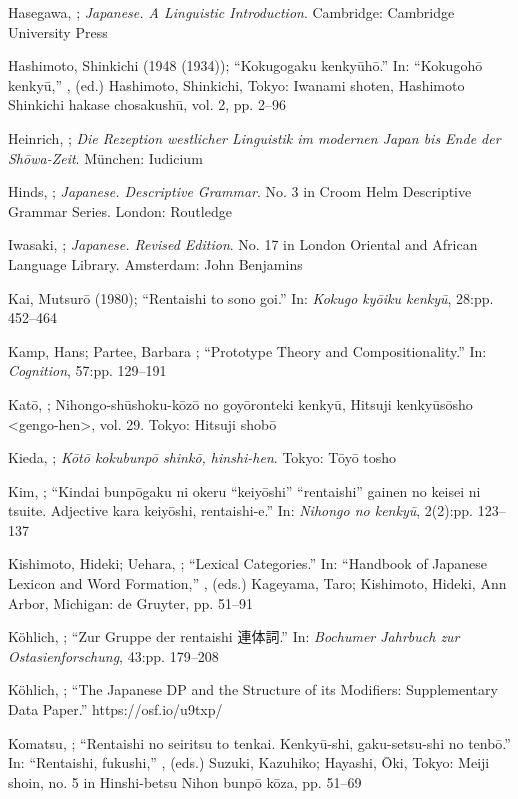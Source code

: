 \documentclass[output=paper]{langscibook}
\begin{document}
Hasegawa, \citet{Yoko2015}; \textit{Japanese. A Linguistic Introduction}. Cambridge: Cambridge University Press 

Hashimoto, Shinkichi (1948 (1934)); “Kokugogaku kenkyūhō.” In: “Kokugohō kenkyū,” , (ed.) Hashimoto, Shinkichi, Tokyo: Iwanami shoten, Hashimoto Shinkichi hakase chosakushū, vol. 2, pp. 2–96 

Heinrich, \citet{Patrick2002}; \textit{Die Rezeption westlicher Linguistik im modernen Japan bis Ende der Shōwa-Zeit}. München: Iudicium

Hinds, \citet{John1988}; \textit{Japanese. Descriptive Grammar}. No. 3 in Croom Helm Descriptive Grammar Series. London: Routledge 

Iwasaki, \citet{Shoichi2013}; \textit{Japanese. Revised Edition}. No. 17 in London Oriental and African Language Library. Amsterdam: John Benjamins 

Kai, Mutsurō (1980); “Rentaishi to sono goi.” In: \textit{Kokugo kyōiku kenkyū}, 28:pp. 452–464 

Kamp, Hans; Partee, Barbara \citet{Hall1995}; “Prototype Theory and Compositionality.” In: \textit{Cognition}, 57:pp. 129–191 

Katō, \citet{Shigehiro2003}; Nihongo-shūshoku-kōzō no goyōronteki kenkyū, Hitsuji kenkyūsōsho <gengo-hen>, vol. 29. Tokyo: Hitsuji shobō

Kieda, \citet{Masuichi1938}; \textit{Kōtō kokubunpō shinkō, hinshi-hen}. Tokyo: Tōyō tosho 

Kim, \citet{Eunju2006}; “Kindai bunpōgaku ni okeru “keiyōshi” “rentaishi” gainen no keisei ni tsuite. Adjective kara keiyōshi, rentaishi-e.” In: \textit{Nihongo no kenkyū}, 2(2):pp. 123–137 

Kishimoto, Hideki; Uehara, \citet{Satoshi2016}; “Lexical Categories.” In: “Handbook of Japanese Lexicon and Word Formation,” , (eds.) Kageyama, Taro; Kishimoto, Hideki, Ann Arbor, Michigan: de Gruyter, pp. 51–91 

Köhlich, \citet{Viktor2020}; “Zur Gruppe der rentaishi 連体詞.” In: \textit{Bochumer Jahrbuch zur Ostasienforschung}, 43:pp. 179–208 

Köhlich, \citet{Viktor2023}; “The Japanese DP and the Structure of its Modifiers: Supplementary Data Paper.” https://osf.io/u9txp/ 

Komatsu, \citet{Hisao1973}; “Rentaishi no seiritsu to tenkai. Kenkyū-shi, gaku-setsu-shi no tenbō.” In: “Rentaishi, fukushi,” , (eds.) Suzuki, Kazuhiko; Hayashi, Ōki, Tokyo: Meiji shoin, no. 5 in Hinshi-betsu Nihon bunpō kōza, pp. 51–69 
\end{document}
